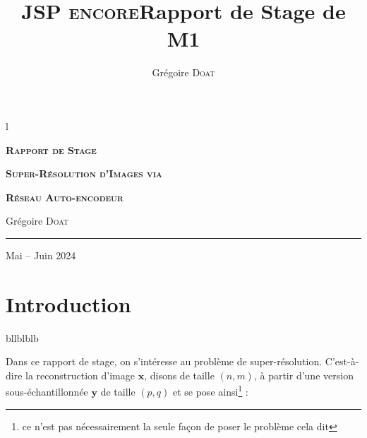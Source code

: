 \documentclass[hidelinks, french]{article} %
\title{\textbf{\textsc{JSP encore}\newline Rapport de Stage de M1}}
\author{}
\date{Grégoire \textsc{Doat}}
\renewcommand{\bf}[1]{\boldsymbol{#1}}
\theoremstyle{enonce}
\theoremstyle{special}
\theoremstyle{rq}
\theoremstyle{exo}
\theoremstyle{demo}
\begin{document}
	
	\captionsetup{labelformat=custom, labelsep=custom}
	
	\begin{titlepage}\centering
		{\color{white}l}
		
		\vspace{1cm}
		
		{\Large\textbf{\textsc{Rapport de Stage}}}
		
		\vspace{1.5cm}
		
		{\huge\scshape\textbf{Super-Résolution d'Images via}}
		
		\vspace{0.2cm}
		
		{\huge\scshape\textbf{Réseau Auto-encodeur}}
		
		\vspace{1.5cm}
		
		{\large Grégoire \textsc{Doat}}\par
		
		\vspace{0.5cm}
		
		
		\vspace{0.5cm}
		
		\rule{10cm}{0.3pt}\par
		
		\vspace{0.7cm}
		{\large Mai -- Juin 2024}
		
		
		\vfill
	\tableofcontents
	
	
	\vspace{0.5cm}
	
\end{titlepage}





{}
\section*{Introduction}
{\color{white}bllblblb}

Dans ce rapport de stage, on s'intéresse au problème de super-résolution. C'est-à-dire la reconstruction d'image $\bf{x}$, disons de taille $(n,m)$, à partir d'une version sous-échantillonnée $\bf{y}$ de taille $(p,q)$ et se pose ainsi\footnote{ce n'est pas nécessairement la seule façon de poser le problème cela dit} :
\end{document}
